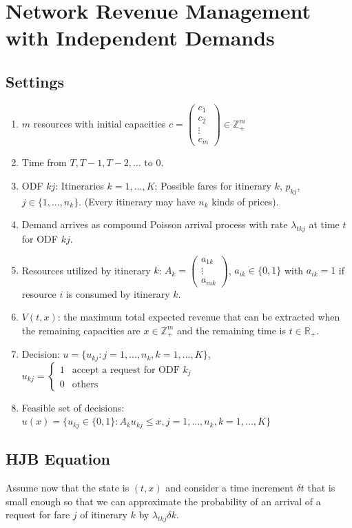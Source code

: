 \documentclass[11pt,a4paper]{article}
\begin{document}
\section{Network Revenue Management with Independent Demands}
\subsection{Settings}
\begin{enumerate}[$\bullet$]
    \item $m$ resources with initial capacities $c=\begin{pmatrix}
        c_1\\
        c_2\\
        \vdots\\
        c_m
    \end{pmatrix}\in \mathbb{Z}_+^m$
    \item Time from $T,T-1,T-2,...$ to $0$.
    \item ODF $kj$: Itineraries $k=1,...,K$; Possible fares for itinerary $k$, $p_{kj}$, $j\in \{1,...,n_k\}$. (Every itinerary may have $n_k$ kinds of prices).
    \item Demand arrives as compound Poisson arrival process with rate $\lambda_{tkj}$ at time $t$ for ODF $kj$.
    \item Resources utilized by itinerary $k$: $A_k=\begin{pmatrix}
        a_{1k}\\
        \vdots\\
        a_{mk}
    \end{pmatrix}$, $a_{ik}\in\{0,1\}$ with $a_{ik}=1$ if resource $i$ is consumed by itinerary $k$.
    \item $V(t,x)$: the maximum total expected revenue that can be extracted when the remaining capacities are $x\in \mathbb{Z}_+^m$ and the remaining time is $t\in \mathbb{R}_+$.
    \item Decision: $u=\{u_{kj}: j=1,...,n_k,k=1,...,K\}$, $u_{kj}=\left\{\begin{matrix}
        1& \text{accept a request for ODF }k_j\\
        0& \text{others}
    \end{matrix}\right.$
    \item Feasible set of decisions: $u(x)=\{u_{kj}\in\{0,1\}: A_ku_{kj}\leq x, j=1,...,n_k,k=1,...,K\}$
\end{enumerate}


\subsection{HJB Equation}
Assume now that the state is $(t, x)$ and consider a time increment $\delta t$ that is small enough so that we can approximate the probability of an arrival of a request for fare $j$ of itinerary $k$ by $\lambda_{tkj}\delta k$.
\end{document}
